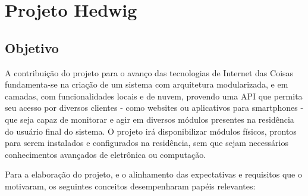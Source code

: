 \section{Projeto Hedwig}

\subsection{Objetivo}
A contribuição do projeto para o avanço das tecnologias de Internet das Coisas fundamenta-se na criação de um sistema com arquitetura modularizada, e em camadas, com funcionalidades locais e de nuvem, provendo uma API que permita seu acesso por diversos clientes - como websites ou aplicativos para smartphones - que seja capaz de monitorar e agir em diversos módulos presentes na residência do usuário final do sistema. O projeto irá disponibilizar módulos físicos, prontos para serem instalados e configurados na residência, sem que sejam necessários conhecimentos avançados de eletrônica ou computação.

Para a elaboração do projeto, e o alinhamento das expectativas e requisitos que o motivaram, os seguintes conceitos desempenharam papéis relevantes:

